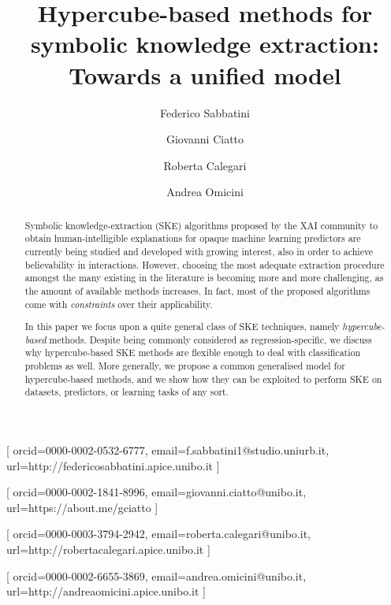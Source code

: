 \documentclass[
]{ceurart}
\begin{document}


\title{Hypercube-based methods for symbolic knowledge extraction: Towards a unified model}

\author[1]{Federico Sabbatini}[%
orcid=0000-0002-0532-6777,
email=f.sabbatini1@studio.uniurb.it,
url=http://federicosabbatini.apice.unibo.it
]\cormark[1]
\address[1]{Dipartimento di Scienze Pure e Applicate (DiSPeA), Universit\`a di Urbino, Italy}

\author[2]{Giovanni Ciatto}[%
orcid=0000-0002-1841-8996,
email=giovanni.ciatto@unibo.it,
url=https://about.me/gciatto
]
\address[2]{Dipartimento di Informatica -- Scienza e Ingegneria (DISI), \textsc{Alma Mater Studiorum}---Universit\`a di Bologna, Italy}

\author[3]{Roberta Calegari}[%
orcid=0000-0003-3794-2942,
email=roberta.calegari@unibo.it,
url=http://robertacalegari.apice.unibo.it
]
\address[3]{Alma Mater Research Institute for Human-Centered Artificial Intelligence, \textsc{Alma Mater Studiorum}---Universit\`a di Bologna, Italy}

\author[2]{Andrea Omicini}[%
orcid=0000-0002-6655-3869,
email=andrea.omicini@unibo.it,
url=http://andreaomicini.apice.unibo.it
]


\begin{abstract}
Symbolic knowledge-extraction (SKE) algorithms proposed by the XAI community to obtain human-intelligible explanations for opaque machine learning predictors are currently being studied and developed with growing interest, also in order to achieve believability in interactions.
%
However, choosing the most adequate extraction procedure amongst the many existing in the literature is becoming more and more challenging, as the amount of available methods increases.
%
In fact, most of the proposed algorithms come with \emph{constraints} over their applicability.

In this paper we focus upon a quite general class of SKE techniques, namely \emph{hypercube-based} methods.
%
Despite being commonly considered as regression-specific, we discuss why hypercube-based SKE methods are flexible enough to deal with classification problems as well.
%
More generally, we propose a common generalised model for hypercube-based methods, and we show how they can be exploited to perform SKE on datasets, predictors, or learning tasks of any sort.
%
%
\end{abstract}
\end{document}
